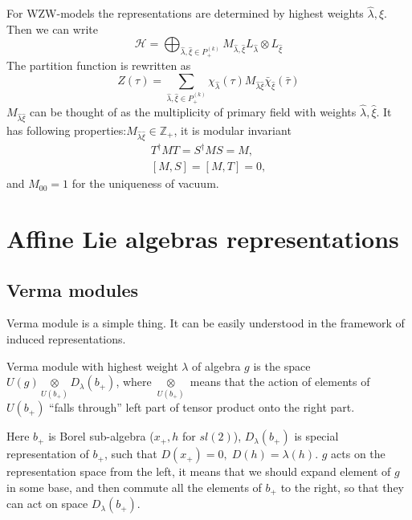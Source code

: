 \documentclass[a4paper,12pt]{article}
\theoremstyle{definition} \newtheorem{Def}{Definition}
\begin{document}
For WZW-models the representations are determined by highest weights $\hat \lambda, \hat \xi$. Then we can write
\begin{equation}
  \label{eq:105}
  \mathcal{H}=\bigoplus_{\hat \lambda,\hat \xi\in P^{(k)}_{+}}M_{\hat \lambda,\hat \xi} L_{\hat \lambda}\otimes L_{\hat \xi}
\end{equation}
The partition function is rewritten as
\begin{equation}
  \label{eq:106}
  Z(\tau)=\sum_{\hat \lambda,\hat \xi\in P^{(k)}_{+}} \chi_{\hat \lambda}(\tau)M_{\hat \lambda\hat\xi}\bar \chi_{\hat \xi}(\bar \tau)
\end{equation}
$M_{\hat \lambda\hat\xi}$ can be thought of as the multiplicity of primary field with weights $\hat\lambda,\hat \xi$. It has following properties:$M_{\hat \lambda\hat\xi}\in \mathbb{Z}_+$, it is modular invariant
\begin{equation}
  \label{eq:108}
  \begin{aligned}
    T^{\dagger}MT=S^{\dagger}MS=M,\\
    [M,S]=[M,T]=0,
  \end{aligned}
\end{equation}
and $M_{00}=1$ for the uniqueness of vacuum. 
 
\section{Affine Lie algebras representations}
\label{sec:affine-lie-algebras}

\subsection{Verma modules}
\label{sec:verma-modules}

Verma module is a simple thing. It can be easily understood in the framework of induced representations. 

Verma module with highest weight $\lambda$ of algebra $g$ is the space $U(g)\underset{U(b_{+})}{\otimes} D_{\lambda}(b_{+})$, where $\underset{U(b_{+})}{\otimes}$ means that the action of elements of $U(b_{+})$ ``falls through'' left part of tensor product onto the right part.

Here $b_{+}$ is Borel sub-algebra ($x_{+},h$ for $sl(2)$), $D_{\lambda}(b_{+})$ is special representation of $b_{+}$, such that $D(x_{+})=0,\; D(h)=\lambda(h)$.
$g$ acts on the representation space from the left, it means that we should expand element of $g$ in some base, and then commute all the elements of $b_{+}$ to the right, so that they can act on space $D_{\lambda}(b_{+})$.
\end{document}
